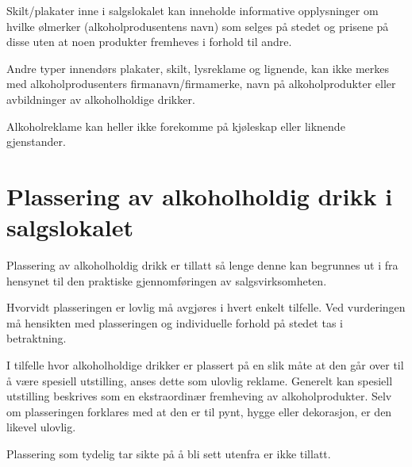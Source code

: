 Skilt/plakater inne i salgslokalet kan inneholde informative opplysninger om hvilke ølmerker (alkoholprodusentens navn) som selges på stedet og prisene på disse uten at noen produkter fremheves i forhold til andre.

Andre typer innendørs plakater, skilt, lysreklame og lignende, kan ikke merkes med alkoholprodusenters firmanavn/firmamerke, navn på alkoholprodukter eller avbildninger av alkoholholdige drikker.

Alkoholreklame kan heller ikke forekomme på kjøleskap eller liknende gjenstander.

\section{Plassering av alkoholholdig drikk i salgslokalet}

Plassering av alkoholholdig drikk er tillatt så lenge denne kan begrunnes ut i fra hensynet til den praktiske gjennomføringen av salgsvirksomheten.

Hvorvidt plasseringen er lovlig må avgjøres i hvert enkelt tilfelle. Ved vurderingen må hensikten med plasseringen og individuelle forhold på stedet tas i betraktning.

I tilfelle hvor alkoholholdige drikker er plassert på en slik måte at den går over til å være spesiell utstilling, anses dette som ulovlig reklame. Generelt kan spesiell utstilling beskrives som en ekstraordinær fremheving av alkoholprodukter. Selv om plasseringen forklares med at den er til pynt, hygge eller dekorasjon, er den likevel ulovlig.

Plassering som tydelig tar sikte på å bli sett utenfra er ikke tillatt. 
